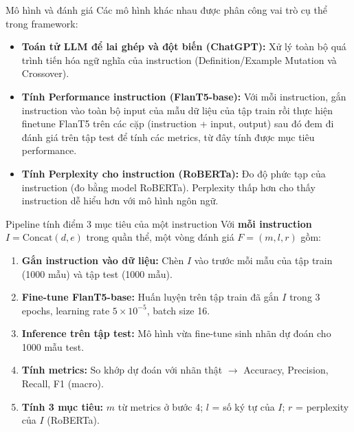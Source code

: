 \documentclass[12pt,xcolor=table]{beamer}
\begin{document}
\begin{frame}{Mô hình và đánh giá}
    \small
    Các mô hình khác nhau được phân công vai trò cụ thể trong framework:
    \vspace{0.1cm}
    \begin{itemize}
        \item \textbf{Toán tử LLM để lai ghép và đột biến (ChatGPT):} Xử lý toàn bộ quá trình tiến hóa ngữ nghĩa của instruction (Definition/Example Mutation và Crossover).
        \vspace{0.05cm}
        \item \textbf{Tính Performance instruction (FlanT5-base):} Với mỗi instruction, gắn instruction vào toàn bộ input của mẫu dữ liệu của tập train rồi thực hiện finetune FlanT5 trên các cặp (instruction + input, output) sau đó đem đi đánh giá trên tập test để tính các metrics, từ đây tính được mục tiêu performance.
        \vspace{0.05cm}
        \item \textbf{Tính Perplexity cho instruction (RoBERTa):} Đo độ phức tạp của instruction (đo bằng model RoBERTa). Perplexity thấp hơn cho thấy instruction dễ hiểu hơn với mô hình ngôn ngữ.
    \end{itemize}
\end{frame}

\begin{frame}{Pipeline tính điểm 3 mục tiêu của một instruction}
    Với \textbf{mỗi instruction} $I=\text{Concat}(d,e)$ trong quần thể, một vòng đánh giá $F=(m,l,r)$ gồm:

    \begin{enumerate}
        \item \textbf{Gắn instruction vào dữ liệu:} Chèn $I$ vào trước mỗi mẫu của tập train (1000 mẫu) và tập test (1000 mẫu).
        \vspace{0.15cm}
        \item \textbf{Fine-tune FlanT5-base:} Huấn luyện trên tập train đã gắn $I$ trong 3 epochs, learning rate $5{\times}10^{-5}$, batch size 16.
        \vspace{0.15cm}
        \item \textbf{Inference trên tập test:} Mô hình vừa fine-tune sinh nhãn dự đoán cho 1000 mẫu test.
        \vspace{0.15cm}
        \item \textbf{Tính metrics:} So khớp dự đoán với nhãn thật $\to$ Accuracy, Precision, Recall, F1 (macro).
        \vspace{0.15cm}
        \item \textbf{Tính 3 mục tiêu:} $m$ từ metrics ở bước 4; $l$ = số ký tự của $I$; $r$ = perplexity của $I$ (RoBERTa).
    \end{enumerate}
\end{frame}
\end{document}
